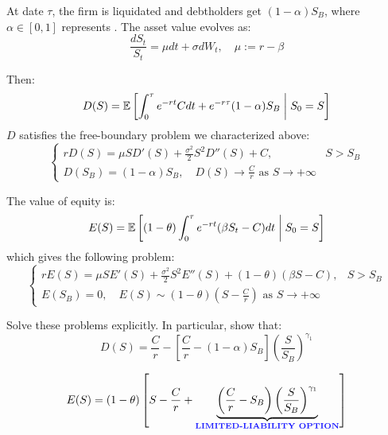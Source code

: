 At date $\tau$, the firm is liquidated and debtholders get $(1-\alpha) S_B$, where $\alpha \in [0,1]$ represents . The asset value evolves as:
\begin{equation*}
    \frac{dS_t}{S_t} = \mu dt + \sigma dW_t, \quad \mu := r - \beta
\end{equation*}

Then:
\begin{equation*}
    D(S) = \mathbb E \left[ \int_0^\tau e^{-rt} C dt + e^{-r\tau} (1-\alpha) S_B \;\middle|\; S_0 = S \right]
\end{equation*}
$D$ satisfies the free-boundary problem we characterized above:
\begin{equation*}
    \begin{cases}
        rD(S) = \mu S D'(S) + \frac{\sigma^2}{2} S^2 D''(S) + C, & S > S_B \\
        D(S_B) = (1-\alpha) S_B, \quad D(S) \to \frac{C}{r} \text{ as } S \to +\infty
    \end{cases}
\end{equation*}

The value of equity is:
\begin{equation*}
    E(S) = \mathbb E \left[ (1-\theta) \int_0^\tau e^{-rt} (\beta S_t - C) dt \;\middle|\; S_0 = S \right]
\end{equation*}
which gives the following problem:
\begin{equation*}
    \begin{cases}
        rE(S) = \mu S E'(S) + \frac{\sigma^2}{2} S^2 E''(S) + (1-\theta)(\beta S - C), & S > S_B \\
        E(S_B) = 0, \quad E(S) \sim (1-\theta)\left(S - \frac{C}{r}\right) \text{ as } S \to +\infty
    \end{cases}
\end{equation*}

\begin{homework*}
    Solve these problems explicitly. In particular, show that:
    \begin{equation*}
        D(S) = \frac{C}{r} - \left[ \frac{C}{r} - (1-\alpha) S_B \right] \left( \frac{S}{S_B} \right)^{\gamma_1}
    \end{equation*}
\end{homework*}

\begin{equation*}
    E(S) = (1-\theta) \left[ S - \frac{C}{r} + \underbrace{\left( \frac{C}{r} - S_B \right) \left( \frac{S}{S_B} \right)^{\gamma_1}}_{\text{\vocab{LIMITED-LIABILITY OPTION}}} \right]
\end{equation*}

